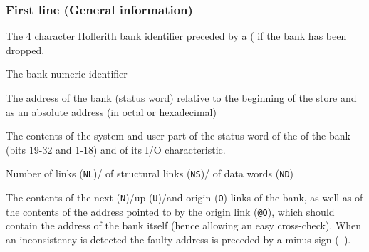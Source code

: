 \subsubsection{First line (General information)}
\begin{OL}
\item The 4 character Hollerith bank identifier preceded by a (
if the bank has been dropped.
\item The bank numeric identifier
\item The address of the bank (status word) relative to the beginning of
the store and as an absolute address (in octal or hexadecimal)
\item The contents of the system and user part of the status word of the
of the bank (bits 19-32 and 1-18) and of its I/O characteristic.
\item Number of links ({\tt NL})/ of structural links
({\tt NS})/ of data words ({\tt ND})
\item The contents of the next ({\tt N})/up ({\tt U})/and origin ({\tt O})
links of the bank,
as well as of the contents of the address pointed to by the origin link
({\tt @O}), which should contain
the address of the bank itself (hence allowing an easy cross-check).
When an inconsistency is detected the
faulty address is preceded by a minus sign ({\tt-}).
\end{OL}
